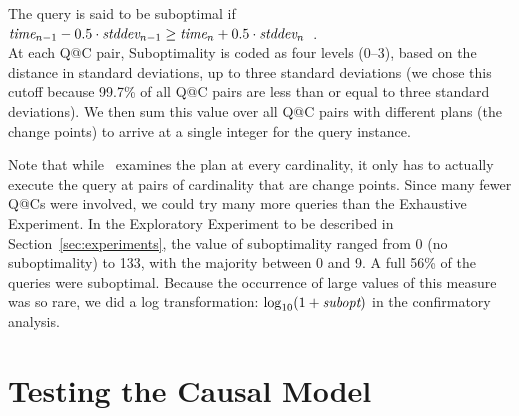 \documentclass[prodmode,acmtods]{acmsmall}
\makeatletter
\def\azdb{\doubleblind{\hbox{\sc AZDBLab}}{\hbox{\sc DBLab}}}
\def\QatC{Q{@}C}
\makeatother
\begin{document}
The query is said to be suboptimal if
$\hbox{\em time}_{n-1} - 0.5 \cdot \hbox{\em stddev}_{n-1} \geq \hbox{\em
time}_n + 0.5 \cdot \hbox{\em stddev}_n$~.\\
At each Q@C pair, Suboptimality is coded as four levels (0--3), based on the distance in 
standard deviations, up to three standard deviations (we chose this cutoff
because 99.7\% of all Q@C pairs are less than or equal to three standard
deviations). 
We then sum this value over all Q@C pairs with different plans
(the change points) to arrive at a single integer for the query instance.

Note that while \azdb\ examines the plan at every cardinality, it only has
to actually execute the query at pairs of cardinality that are change
points.  Since many fewer {\QatC}s were involved, we could try many more
queries than the \hbox{Exhaustive} \hbox{Experiment}. In the Exploratory Experiment to be
described in Section~\ref{sec:experiments}, the value of suboptimality ranged
from 0 (no suboptimality) to 133, with the majority between 0 and 9. A full 56\% of
the queries were suboptimal.  \hbox{Because} the occurrence of large values of this
measure was so rare, we did a log transformation: $\log_{10} (1 + \mbox{\em
  subopt})$ in the confirmatory analysis.

\section{Testing the Causal Model}
\end{document}
